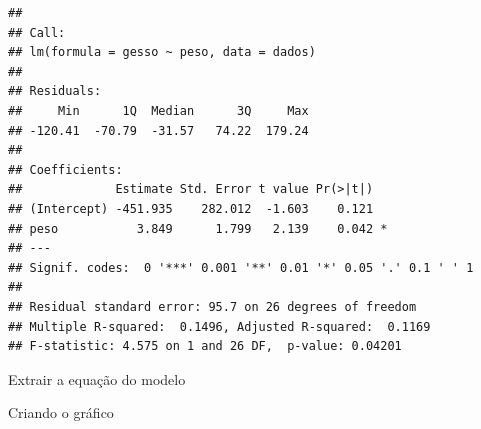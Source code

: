 \documentclass[
]{book}
\newenvironment{Shaded}{\begin{snugshade}}{\end{snugshade}}
\newcommand{\DataTypeTok}[1]{\textcolor[rgb]{0.13,0.29,0.53}{#1}}
\newcommand{\DecValTok}[1]{\textcolor[rgb]{0.00,0.00,0.81}{#1}}
\newcommand{\ErrorTok}[1]{\textcolor[rgb]{0.64,0.00,0.00}{\textbf{#1}}}
\newcommand{\KeywordTok}[1]{\textcolor[rgb]{0.13,0.29,0.53}{\textbf{#1}}}
\newcommand{\NormalTok}[1]{#1}
\newcommand{\OperatorTok}[1]{\textcolor[rgb]{0.81,0.36,0.00}{\textbf{#1}}}
\newcommand{\StringTok}[1]{\textcolor[rgb]{0.31,0.60,0.02}{#1}}
\begin{document}
\begin{verbatim}
## 
## Call:
## lm(formula = gesso ~ peso, data = dados)
## 
## Residuals:
##     Min      1Q  Median      3Q     Max 
## -120.41  -70.79  -31.57   74.22  179.24 
## 
## Coefficients:
##             Estimate Std. Error t value Pr(>|t|)  
## (Intercept) -451.935    282.012  -1.603    0.121  
## peso           3.849      1.799   2.139    0.042 *
## ---
## Signif. codes:  0 '***' 0.001 '**' 0.01 '*' 0.05 '.' 0.1 ' ' 1
## 
## Residual standard error: 95.7 on 26 degrees of freedom
## Multiple R-squared:  0.1496, Adjusted R-squared:  0.1169 
## F-statistic: 4.575 on 1 and 26 DF,  p-value: 0.04201
\end{verbatim}

Extrair a equação do modelo

\begin{Shaded}
\end{Shaded}

Criando o gráfico
\end{document}
